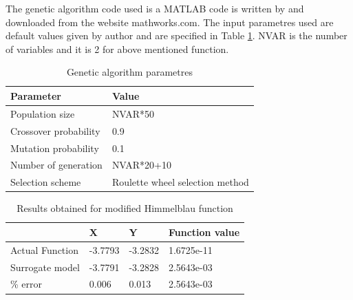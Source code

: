 The genetic algorithm code used is a MATLAB code is written by \cite{Xavier} and downloaded from the website mathworks.com. The input parametres used are default values given by author and are specified in Table \ref{Genetic algorithm parametres}. NVAR is the number of variables and it is 2 for above mentioned function.
\begin{table}[H]
	\centering
	\caption{Genetic algorithm parametres}
	\label{Genetic algorithm parametres}
	\begin{tabular}{ll}
		\hline \hline
		Parameter & Value \\
		\hline
		Population size & NVAR*50 \\
 		Crossover probability & 0.9 \\
 		Mutation probability & 0.1 \\
 		Number of generation & NVAR*20+10 \\
 		Selection scheme & Roulette wheel selection method \\
		
		\hline \hline
		
	\end{tabular}
\end{table}


\begin{table}[H]
	\centering
	\caption{Results obtained for modified Himmelblau function}
	\label{Results obtained for modified Himmelblau function}
	\begin{tabular}{llll}
		\hline \hline
		& X & Y & Function value \\ \hline
		Actual Function & -3.7793 &-3.2832 &1.6725e-11 \\
		Surrogate model & -3.7791 &-3.2828 & 2.5643e-03 \\ \hline
		\% error & 0.006 & 0.013 & 2.5643e-03 \\
		\hline \hline
		
	\end{tabular}
\end{table}

